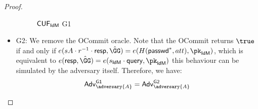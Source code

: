 \begin{proof}
\begin{itemize}
\begin{figure*}
{\begin{pchstack}[center, space=0.2cm, boxed]
\begin{pcvstack}
    \end{pcvstack}
    \begin{pcvstack}
    \end{pcvstack}
    \end{pchstack}
}
\caption{$\mathsf{CUF}_{\textsf{IdM}}$ \textsf{G1}}
\label{game:cuf_idmg1}
\end{figure*}

        \item \textsf{G2}: We remove the \textsf{OCommit} oracle. Note that the \textsf{OCommit} returns $\true$ if and only if $e(sA\cdot r^{-1}\cdot \response, \GGhat) = e(H(\pseudo^*, att), \pk_\idm)$, which is equivalent to $e(\response, \GGhat) = e(s_\idm\cdot\query, \pk_\idm)$  this behaviour can be simulated by the adversary itself. Therefore, we have:
        \begin{align*}
            \advtg_\adversary{A}^{\mathsf{G1}} = \advtg_\adversary{A}^{\mathsf{G2}}\\
        \end{align*}


\end{itemize}
\end{proof}
